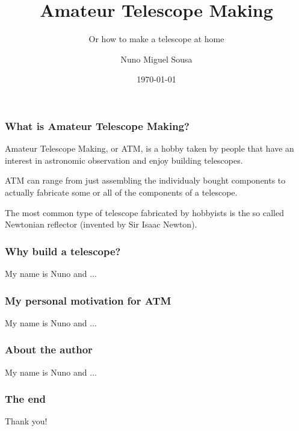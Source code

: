 \documentclass{beamer}
\title{Amateur Telescope Making}
\subtitle{Or how to make a telescope at home}
\author{Nuno Miguel Sousa}
\institute{Coimbra, Portugal}
\date{\today}
\begin{document}
\begin{frame}
\titlepage
\end{frame}

\begin{frame}
\frametitle{What is Amateur Telescope Making?}
\begin{block}{}
Amateur Telescope Making, or ATM, is a hobby taken by people that have an interest in astronomic observation and enjoy building telescopes\footnotemark.
\end{block}
\begin{block}{}
ATM can range from just assembling the individualy bought components to actually fabricate some or all of the components of a telescope.
\end{block}
\begin{block}{}
The most common type of telescope fabricated by hobbyists is the so called Newtonian reflector (invented by Sir Isaac Newton)\footnotemark.
\end{block}
\end{frame}

\begin{frame}
\frametitle{Why build a telescope?}
My name is Nuno and ...
\end{frame}

\begin{frame}
\frametitle{My personal motivation for ATM}
My name is Nuno and ...
\end{frame}

\begin{frame}
\frametitle{About the author}
My name is Nuno and ...
\end{frame}

\begin{frame}
\frametitle{The end}
Thank you!
\end{frame}
\end{document}

